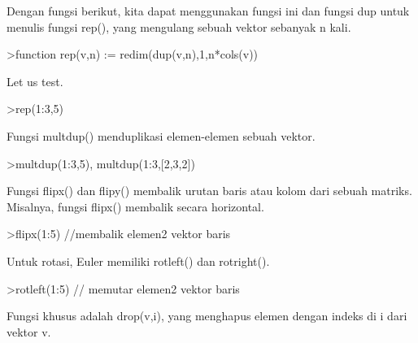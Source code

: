 \documentclass[a4paper,10pt]{article}
\begin{document}
\begin{eulernotebook}
\begin{eulercomment}
\begin{eulercomment}
\begin{eulercomment}
\begin{eulercomment}
\begin{eulercomment}
\begin{eulercomment}
\begin{eulercomment}
Dengan fungsi berikut, kita dapat menggunakan fungsi ini dan fungsi
dup untuk menulis fungsi rep(), yang mengulang sebuah vektor sebanyak
n kali.
\end{eulercomment}
\begin{eulerprompt}
>function rep(v,n) := redim(dup(v,n),1,n*cols(v))
\end{eulerprompt}
\begin{eulercomment}
Let us test.
\end{eulercomment}
\begin{eulerprompt}
>rep(1:3,5)
\end{eulerprompt}
\begin{euleroutput}
  [1,  2,  3,  1,  2,  3,  1,  2,  3,  1,  2,  3,  1,  2,  3]
\end{euleroutput}
\begin{eulercomment}
Fungsi multdup() menduplikasi elemen-elemen sebuah vektor.
\end{eulercomment}
\begin{eulerprompt}
>multdup(1:3,5), multdup(1:3,[2,3,2])
\end{eulerprompt}
\begin{euleroutput}
  [1,  1,  1,  1,  1,  2,  2,  2,  2,  2,  3,  3,  3,  3,  3]
  [1,  1,  2,  2,  2,  3,  3]
\end{euleroutput}
\begin{eulercomment}
Fungsi flipx() dan flipy() membalik urutan baris atau kolom dari
sebuah matriks. Misalnya, fungsi flipx() membalik secara horizontal.
\end{eulercomment}
\begin{eulerprompt}
>flipx(1:5) //membalik elemen2 vektor baris
\end{eulerprompt}
\begin{euleroutput}
  [5,  4,  3,  2,  1]
\end{euleroutput}
\begin{eulercomment}
Untuk rotasi, Euler memiliki rotleft() dan rotright().
\end{eulercomment}
\begin{eulerprompt}
>rotleft(1:5) // memutar elemen2 vektor baris
\end{eulerprompt}
\begin{euleroutput}
  [2,  3,  4,  5,  1]
\end{euleroutput}
\begin{eulercomment}
Fungsi khusus adalah drop(v,i), yang menghapus elemen dengan indeks di
i dari vektor v.
\end{eulercomment}

\end{eulercomment}
\end{eulercomment}
\end{eulercomment}
\end{eulercomment}
\end{eulercomment}
\end{eulercomment}
\end{eulernotebook}
\end{document}
